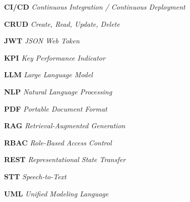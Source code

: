 \documentclass[a4paper,12pt]{report}
\begin{document}
\noindent\textbf{CI/CD} \hspace{1.1cm} \textit{Continuous Integration / Continuous Deployment}

\noindent\textbf{CRUD} \hspace{1.1cm} \textit{Create, Read, Update, Delete}

\noindent\textbf{JWT} \hspace{1.4cm} \textit{JSON Web Token}

\noindent\textbf{KPI} \hspace{1.55cm} \textit{Key Performance Indicator}

\noindent\textbf{LLM} \hspace{1.45cm} \textit{Large Language Model}

\noindent\textbf{NLP} \hspace{1.5cm} \textit{Natural Language Processing}

\noindent\textbf{PDF} \hspace{1.55cm} \textit{Portable Document Format}

\noindent\textbf{RAG} \hspace{1.5cm} \textit{Retrieval-Augmented Generation}

\noindent\textbf{RBAC} \hspace{1.2cm} \textit{Role-Based Access Control}

\noindent\textbf{REST} \hspace{1.3cm} \textit{Representational State Transfer}

\noindent\textbf{STT} \hspace{1.55cm} \textit{Speech-to-Text}

\noindent\textbf{UML} \hspace{1.4cm} \textit{Unified Modeling Language}

\newpage




% 
% 
\end{document}
